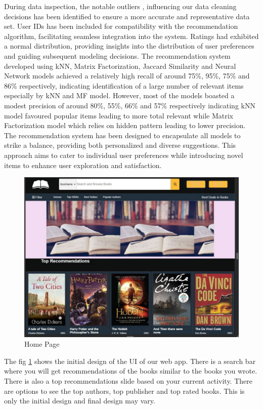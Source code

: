     During data inspection, the notable outliers , influencing our data cleaning decisions has been identified to ensure a more accurate and representative data set.
     User IDs has been included for compatibility with the recommendation algorithm, facilitating seamless integration into the system.
     Ratings had exhibited a normal distribution, providing insights into the distribution of user preferences and guiding subsequent modeling decisions.
     \newpage
     The recommendation system developed using kNN, Matrix Factorization, Jaccard Similarity and Neural Network models achieved a relatively high recall of around 75\%, 95\%, 75\% and 86\% respectively, indicating identification of a large number of relevant items especially by kNN and MF model.
     However, most of the models boasted a modest precision of around 80\%, 55\%, 66\% and 57\% respectively indicating kNN model favoured popular items leading to more total relevant while Matrix Factorization model which relies on hidden pattern leading to lower precision. The recommendation system has been designed to encapsulate all models to strike a balance, providing both personalized and diverse suggestions. This approach aims to cater to individual user preferences while introducing novel items to enhance user exploration and satisfaction.
\begin{figure}[h]
        \centering
        \includegraphics[width=0.8\linewidth]{img/Graphics/user interface.jpg}
        \caption{Home Page}
        \label{Home}
    \end{figure}
    
    The fig \ref{Home} shows the initial design of the UI of our web app. There is a search bar where you will get recommendations of the books similar to the books you wrote. There is also a top recommendations slide based on your current activity. There are options to see the top authors, top publisher and top rated books. This is only the initial design and final design may vary.

